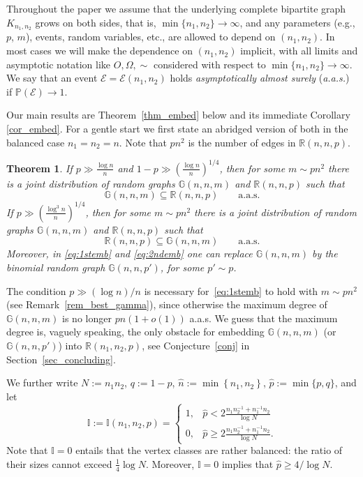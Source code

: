 \documentclass[12pt,reqno]{amsart}
\newcommand{\Prob} {\mathbb {P}}
\newcommand{\prob}[1]{\Prob\left(#1\right)}
\newcommand{\R} {\mathbb R}
\newcommand{\Rnnp}{\R(n_1,n_2,p)}
\newcommand{\G} {\mathbb G}
\newcommand{\Knn} {K_{n_1,n_2}}
\newcommand{\I} {\mathbb I}
\newtheorem{theorem}{Theorem}
\theoremstyle{definition}
\begin{document}
	Throughout the paper we assume that the underlying complete bipartite graph $\Knn$ grows on both sides, that is, $\min\{n_1,n_2\} \to \infty$, and any parameters (e.g., $p$, $m$), events, random variables, etc., are allowed to depend on $(n_1,n_2)$.
In most cases we will make the dependence on $(n_1,n_2)$ implicit, with all limits and asymptotic notation like $O, \Omega, \sim$ considered with respect to $\min\{n_1,n_2\} \to \infty$. We say that an event $\mathcal E = \mathcal E(n_1,n_2)$  holds \emph{asymptotically almost surely} (\emph{a.a.s.}) if $\prob{\mathcal E} \to 1$.



Our main results are Theorem~\ref{thm_embed} below and its immediate Corollary \ref{cor_embed}. For a gentle start we first state an abridged version of both in the balanced case $n_1 = n_2 = n$. Note that $pn^2$ is the number of edges in $\R(n,n,p)$.
\begin{theorem}
  \label{thm_simple}
	If $p\gg\frac{\log n}{n}$ and $1 - p \gg \left( \frac{\log n}{n} \right)^{1/4}$, then for some $m \sim pn^2$ there is a joint distribution of random graphs $\G(n,n,m)$ and $\R(n,n,p)$ such that
    \begin{equation}
      \label{eq:1stemb}
	    \G(n,n,m) \subseteq \R(n,n,p) \qquad \text{a.a.s.}
    \end{equation}
    If $p\gg\left(\frac{\log^3 n}{n}\right)^{1/4}$, then for some $m \sim pn^2$ there is a joint distribution of random graphs $\G(n,n,m)$ and $\R(n,n,p)$ such that
    \begin{equation}
      \label{eq:2ndemb}
	    \R(n,n,p) \subseteq \G(n,n,m)  \qquad \text{a.a.s.}
    \end{equation}
    Moreover, in \eqref{eq:1stemb} and \eqref{eq:2ndemb} one can replace $\G(n,n,m)$ by the binomial random graph $\G(n,n,p')$, for some $p' \sim p$.
\end{theorem}
The condition $p \gg (\log n)/n$ is necessary for~\eqref{eq:1stemb} to hold with $m \sim pn^2$ (see Remark~\ref{rem_best_gamma}), since otherwise the maximum degree of $\G(n,n,m)$ is no longer $pn(1+o(1))$ a.a.s. We guess that the maximum degree is, vaguely speaking, the only obstacle for embedding $\G(n,n,m)$ (or $\G(n,n,p')$) into $\Rnnp$, see Conjecture~\ref{conj} in Section~\ref{sec_concluding}.

We further write $N := n_1n_2$, $q := 1 - p$, $\hat n := \min \left\{ n_1, n_2 \right\}$, $\hat p := \min \{p, q\}$, and let
\begin{equation}
  \label{eq_defI}
	\I :=\I(n_1,n_2,p)= \begin{cases}
		1, & \hat p < 2\frac{n_1n_2^{-1} + n_1^{-1}n_2}{\log N}\\
		0, & \hat p \ge 2\frac{n_1n_2^{-1} + n_1^{-1}n_2}{\log N}.
	\end{cases}
\end{equation}
Note that $\I=0$ entails that the vertex classes are rather balanced: the ratio of their sizes cannot exceed $\tfrac 1 4 \log N$. Moreover, $\I=0$ implies that $\hat p \ge 4/\log N$.
\end{document}
